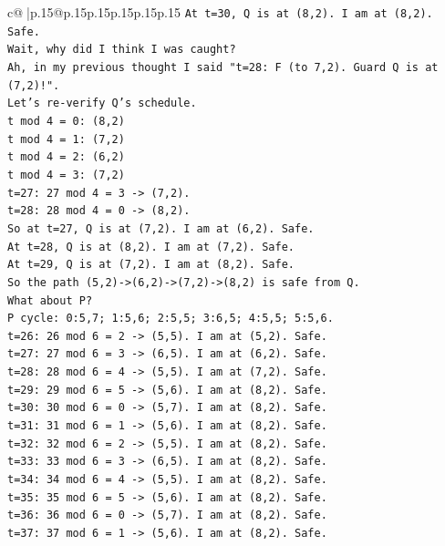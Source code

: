 \documentclass{article}
\begin{document}
{\begin{supertabular}{c@{$\;$}|p{.15\linewidth}@{}p{.15\linewidth}p{.15\linewidth}p{.15\linewidth}p{.15\linewidth}p{.15\linewidth}}
{{{\texttt{At t=30, Q is at (8,2). I am at (8,2). Safe.} \\
\texttt{Wait, why did I think I was caught?} \\
\texttt{Ah, in my previous thought I said "t=28: F (to 7,2). Guard Q is at (7,2)!".} \\
\texttt{Let's re{-}verify Q's schedule.} \\
\texttt{t mod 4 = 0: (8,2)} \\
\texttt{t mod 4 = 1: (7,2)} \\
\texttt{t mod 4 = 2: (6,2)} \\
\texttt{t mod 4 = 3: (7,2)} \\
\texttt{t=27: 27 mod 4 = 3 {-}> (7,2).} \\
\texttt{t=28: 28 mod 4 = 0 {-}> (8,2).} \\
\texttt{So at t=27, Q is at (7,2). I am at (6,2). Safe.} \\
\texttt{At t=28, Q is at (8,2). I am at (7,2). Safe.} \\
\texttt{At t=29, Q is at (7,2). I am at (8,2). Safe.} \\
\texttt{So the path (5,2){-}>(6,2){-}>(7,2){-}>(8,2) is safe from Q.} \\
\texttt{What about P?} \\
\texttt{P cycle: 0:5,7; 1:5,6; 2:5,5; 3:6,5; 4:5,5; 5:5,6.} \\
\texttt{t=26: 26 mod 6 = 2 {-}> (5,5). I am at (5,2). Safe.} \\
\texttt{t=27: 27 mod 6 = 3 {-}> (6,5). I am at (6,2). Safe.} \\
\texttt{t=28: 28 mod 6 = 4 {-}> (5,5). I am at (7,2). Safe.} \\
\texttt{t=29: 29 mod 6 = 5 {-}> (5,6). I am at (8,2). Safe.} \\
\texttt{t=30: 30 mod 6 = 0 {-}> (5,7). I am at (8,2). Safe.} \\
\texttt{t=31: 31 mod 6 = 1 {-}> (5,6). I am at (8,2). Safe.} \\
\texttt{t=32: 32 mod 6 = 2 {-}> (5,5). I am at (8,2). Safe.} \\
\texttt{t=33: 33 mod 6 = 3 {-}> (6,5). I am at (8,2). Safe.} \\
\texttt{t=34: 34 mod 6 = 4 {-}> (5,5). I am at (8,2). Safe.} \\
\texttt{t=35: 35 mod 6 = 5 {-}> (5,6). I am at (8,2). Safe.} \\
\texttt{t=36: 36 mod 6 = 0 {-}> (5,7). I am at (8,2). Safe.} \\
\texttt{t=37: 37 mod 6 = 1 {-}> (5,6). I am at (8,2). Safe.} \\
}}}
\end{supertabular}}
\end{document}
